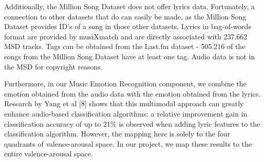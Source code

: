 \documentclass[10pt,journal,compsoc]{IEEEtran}
\begin{document}
Additionally, the Million Song Dataset does not offer lyrics data. Fortunately, a connection to other datasets that do can easily be made, as the Million Song Dataset provides ID's of a song in those other datasets. Lyrics in bag-of-words format are provided by musiXmatch and are directly associated with 237.662 MSD tracks. Tags can be obtained from the Last.fm dataset - 505.216 of the songs from the Million Song Dataset have at least one tag. Audio data is not in the MSD for copyright reasons. 

Furthermore, in our Music Emotion Recognition component, we combine the emotion obtained from the audio data with the emotion obtained from the lyrics. Research by Yang et al [8] shows that this multimodal approach can greatly enhance audio-based classification algorithms: a relative improvement gain in classification accuracy of up to 21\% is observed when adding lyric features to the classification algorithm. However, the mapping here is solely to the four quadrants of valence-arousal space. In our project, we map these results to the entire valence-arousal space.
\end{document}

